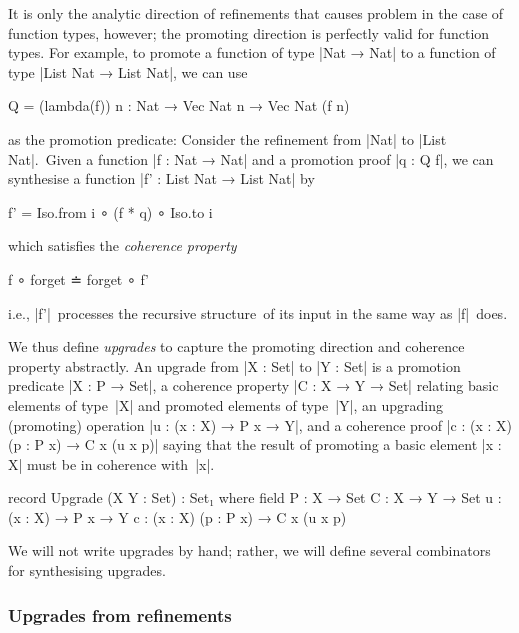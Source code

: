 It is only the analytic direction of refinements that causes problem in the case of function types, however; the promoting direction is perfectly valid for function types.
For example, to promote a function of type |Nat → Nat| to a function of type |List Nat → List Nat|, we can use
\begin{code}
Q = (lambda(f)) {n : Nat} → Vec Nat n → Vec Nat (f n)
\end{code}
as the promotion predicate:
Consider the refinement from |Nat| to |List Nat|.\ 
Given a function |f : Nat → Nat| and a promotion proof |q : Q f|, we can synthesise a function |f' : List Nat → List Nat| by
\begin{code}
f' = Iso.from i ∘ (f * q) ∘ Iso.to i
\end{code}
which satisfies the \emph{coherence property}~\citep{Dagand-functional-ornaments}
\begin{code}
f ∘ forget ≐ forget ∘ f'
\end{code}
i.e., |f'|~processes the recursive structure\ of its input in the same way as |f|~does.

We thus define \emph{upgrades} to capture the promoting direction and coherence property abstractly.
An upgrade from |X : Set| to |Y : Set| is a promotion predicate |X : P → Set|, a coherence property |C : X → Y → Set| relating basic elements of type~|X| and promoted elements of type~|Y|, an upgrading (promoting) operation |u : (x : X) → P x → Y|, and a coherence proof |c : (x : X) (p : P x) → C x (u x p)| saying that the result of promoting a basic element |x : X| must be in coherence with~|x|.
\begin{code}
record Upgrade (X Y : Set) : Set₁ where
  field
    P  :  X → Set
    C  :  X → Y → Set
    u  :  (x : X) → P x → Y
    c  :  (x : X) (p : P x) → C x (u x p)
\end{code}
We will not write upgrades by hand; rather, we will define several combinators for synthesising upgrades.

\subsubsection{Upgrades from refinements}

